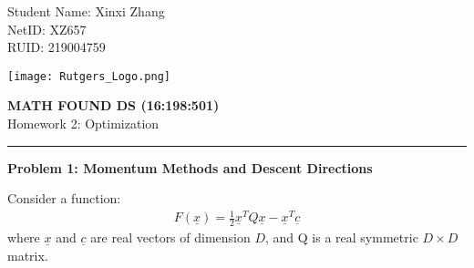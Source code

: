 \documentclass[11pt,letterpaper]{article}
\begin{document}
\pagestyle{plain}

\begin{flushleft}
Student Name: Xinxi Zhang\\
NetID: XZ657  \\
RUID: 219004759
\end{flushleft}

\begin{flushright}\vspace{-15mm}
\texttt{[image: Rutgers\_Logo.png]}
\end{flushright}
 
\begin{center}\vspace{-1cm}
\textbf{\large MATH FOUND DS (16:198:501)}\\
Homework 2: Optimization
\end{center}

 
\rule{\linewidth}{0.1mm}

\bigskip
\bigskip
\textbf{\large Problem 1: Momentum Methods and Descent Directions}\\

\begin{flushleft}
    Consider a function:
    \begin{align}
        F(\underline x) = \frac{1}{2} \underline x^T Q \underline x - \underline x^T \underline c
    \end{align}
    where $\underline x$ and $\underline c$ are real vectors of dimension $D$, and Q is a real symmetric $D \times D$ matrix.
\end{flushleft}
\end{document}
